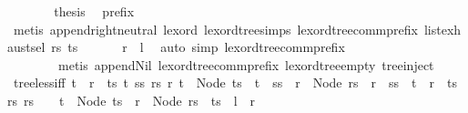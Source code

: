 \begin{isabellebody}
\ \ \ \ \isamarkupfalse%
\ \isamarkupfalse%
\ {\isacharquery}{\kern0pt}thesis\ \isamarkupfalse%
\ prefix\isanewline
\ \ \ \ \ \ \isamarkupfalse%
\ {\isacharparenleft}{\kern0pt}metis\ append{\isachardot}{\kern0pt}right{\isacharunderscore}{\kern0pt}neutral\ lexord\ lexord{\isacharunderscore}{\kern0pt}tree{\isachardot}{\kern0pt}simps{\isacharparenleft}{\kern0pt}{}{\isacharparenright}{\kern0pt}\ lexord{\isacharunderscore}{\kern0pt}tree{\isacharunderscore}{\kern0pt}comm{\isacharunderscore}{\kern0pt}prefix\ list{\isachardot}{\kern0pt}exhaust{\isacharunderscore}{\kern0pt}sel\ rs\ ts{\isacharparenright}{\kern0pt}\isanewline
\ \ \isamarkupfalse%
\isanewline
\ \ \isamarkupfalse%
\ {\isachardoublequoteopen}{\isacharquery}{\kern0pt}r\ {\isasymLongrightarrow}\ {\isacharquery}{\kern0pt}l{\isachardoublequoteclose}\ \isamarkupfalse%
\ {\isacharparenleft}{\kern0pt}auto\ simp{\isacharcolon}{\kern0pt}\ lexord{\isacharunderscore}{\kern0pt}tree{\isacharunderscore}{\kern0pt}comm{\isacharunderscore}{\kern0pt}prefix{\isacharcomma}{\kern0pt}\isanewline
\ \ \ \ \ \ \ \ metis\ append{\isacharunderscore}{\kern0pt}Nil{}\ lexord{\isacharunderscore}{\kern0pt}tree{\isacharunderscore}{\kern0pt}comm{\isacharunderscore}{\kern0pt}prefix\ lexord{\isacharunderscore}{\kern0pt}tree{\isacharunderscore}{\kern0pt}empty{}\ tree{\isachardot}{\kern0pt}inject{\isacharparenright}{\kern0pt}\isanewline
{}\isamarkupfalse%
%
\endisatagproof
{\isafoldproof}%
%
\isadelimproof
\isanewline
%
\endisadelimproof
\isanewline
{}\isamarkupfalse%
\ tree{\isacharunderscore}{\kern0pt}less{\isacharunderscore}{\kern0pt}iff{\isacharcolon}{\kern0pt}\ {\isachardoublequoteopen}t\ {\isacharless}{\kern0pt}\ r\ {\isasymlongleftrightarrow}\ {\isacharparenleft}{\kern0pt}{\isasymexists}ts\ t{\isacharprime}{\kern0pt}\ ss\ rs\ r{\isacharprime}{\kern0pt}{\isachardot}{\kern0pt}\ t\ {\isacharequal}{\kern0pt}\ Node\ {\isacharparenleft}{\kern0pt}ts\ {\isacharat}{\kern0pt}\ t{\isacharprime}{\kern0pt}\ {\isacharhash}{\kern0pt}\ ss{\isacharparenright}{\kern0pt}\ {\isasymand}\ r\ {\isacharequal}{\kern0pt}\ Node\ {\isacharparenleft}{\kern0pt}rs\ {\isacharat}{\kern0pt}\ r{\isacharprime}{\kern0pt}\ {\isacharhash}{\kern0pt}\ ss{\isacharparenright}{\kern0pt}\ {\isasymand}\ t{\isacharprime}{\kern0pt}\ {\isacharless}{\kern0pt}\ r{\isacharprime}{\kern0pt}{\isacharparenright}{\kern0pt}\ {\isasymor}\ {\isacharparenleft}{\kern0pt}{\isasymexists}ts\ rs{\isachardot}{\kern0pt}\ rs\ {\isasymnoteq}\ {\isacharbrackleft}{\kern0pt}{\isacharbrackright}{\kern0pt}\ {\isasymand}\ t\ {\isacharequal}{\kern0pt}\ Node\ ts\ {\isasymand}\ r\ {\isacharequal}{\kern0pt}\ Node\ {\isacharparenleft}{\kern0pt}rs\ {\isacharat}{\kern0pt}\ ts{\isacharparenright}{\kern0pt}{\isacharparenright}{\kern0pt}{\isachardoublequoteclose}\ {\isacharparenleft}{\kern0pt}\ {\isachardoublequoteopen}{\isacharquery}{\kern0pt}l\ {\isasymlongleftrightarrow}\ {\isacharquery}{\kern0pt}r{\isachardoublequoteclose}{\isacharparenright}{\kern0pt}\isanewline

\end{isabellebody}
